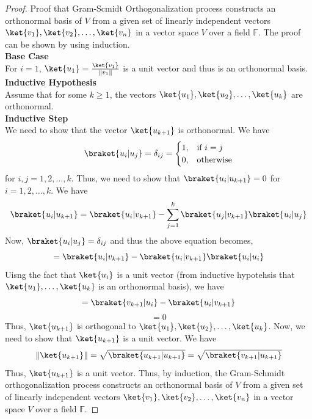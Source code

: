 \documentclass[12pt, oneside]{book}
\theoremstyle{definition}
\theoremstyle{definition}
\theoremstyle{remark}
\begin{document}
\begin{proof}
    Proof that Gram-Scmidt Orthogonalization process constructs an orthonormal basis of $V$ from a given set of linearly independent vectors $\ket{v_1},\ket{v_2},\ldots,\ket{v_n}$ in a vector space $V$ over a field $\mathbb{F}$.
    The proof can be shown by using induction.\\
    \textbf{Base Case}\\
    For $i=1$, $\ket{u_1}=\frac{\ket{v_1}}{\|v_1\|}$ is a unit vector and thus is an orthonormal basis.\\
    \textbf{Inductive Hypothesis}\\
    Assume that for some $k\geq 1$, the vectors $\ket{u_1},\ket{u_2},\ldots,\ket{u_k}$ are orthonormal.\\
    \textbf{Inductive Step}\\
    We need to show that the vector $\ket{u_{k+1}}$ is orthonormal. We have
    \[
        \braket{u_i|u_j}=\delta_{ij}=
        \begin{cases}
            1, & \text{if } i=j\\
            0, & \text{otherwise}
        \end{cases}
    \]
    for $i,j=1,2,\ldots,k$. Thus, we need to show that $\braket{u_i|u_{k+1}}=0$ for $i=1,2,\ldots,k$. We have
    \[
        \braket{u_i|u_{k+1}}=\braket{u_i|v_{k+1}}-\sum_{j=1}^{k}\braket{u_j|v_{k+1}}\braket{u_i|u_j}
    \]
    Now, $\braket{u_i|u_j}=\delta_{ij}$ and thus the above equation becomes,
    \[
        =\braket{u_i|v_{k+1}}-\braket{u_i|v_{k+1}}\braket{u_i|u_i}
    \]
    Uisng the fact that $\ket{u_i}$ is a unit vector (from inductive hypotehsis that $\ket{u_1}, \ldots, \ket{u_k}$ is an orthonormal basis), we have
    \[
        =\braket{v_{k+1}|u_i}-\braket{u_i|v_{k+1}}
    \]
    \[
        =0
    \]
    Thus, $\ket{u_{k+1}}$ is orthogonal to $\ket{u_1},\ket{u_2},\ldots,\ket{u_k}$. Now, we need to show that $\ket{u_{k+1}}$ is a unit vector. We have
    \[
        \|\ket{u_{k+1}}\|=\sqrt{\braket{u_{k+1}|u_{k+1}}}=\sqrt{\braket{v_{k+1}|u_{k+1}}}
    \]
    Thus, $\ket{u_{k+1}}$ is a unit vector. Thus, by induction, the Gram-Schmidt orthogonalization process constructs an orthonormal basis of $V$ from a given set of linearly independent vectors $\ket{v_1},\ket{v_2},\ldots,\ket{v_n}$ in a vector space $V$ over a field $\mathbb{F}$.

\end{proof}
\end{document}
